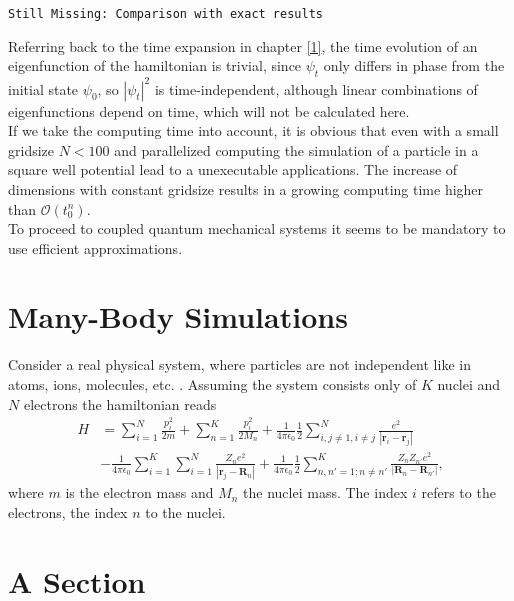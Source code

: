\documentclass[10pt,a4paper]{article} %
\begin{document}
\begin{lstlisting}
Still Missing: Comparison with exact results
\end{lstlisting}

Referring back to the time expansion in chapter \ref{1}, the time evolution of an eigenfunction of the hamiltonian is trivial, since $\psi_t$ only differs in phase from the initial state $\psi_0$, so ${|\psi_t|}^2$ is time-independent, although linear combinations of eigenfunctions depend on time, which will not be calculated here.\\

If we take the computing time into account, it is obvious that even with a small gridsize $N<100$ and parallelized computing the simulation of a particle in a square well potential lead to a unexecutable applications. The increase of dimensions with constant gridsize results in a growing computing time higher than $\mathcal O (t_0^n)$. \\

To proceed to coupled quantum mechanical systems it seems to be mandatory to use efficient approximations.




    \section{Many-Body Simulations}
    
    Consider a real physical system, where particles are not independent like in atoms, ions, molecules, etc. . Assuming the system consists only of $K$ nuclei and $N$ electrons the hamiltonian reads
    \begin{align*}
    H &= \sum_{i=1}^N \frac{p_i^2}{2m} + \sum_{n=1}^K \frac{p_i^2}{2M_n} + \frac{1}{4\pi \epsilon_0}\frac{1}{2}\sum_{i,j\neq 1, i \neq j}^N \frac{e^2}{|\mathbf{r}_i - \mathbf{r}_j|} \\ &-  \frac{1}{4\pi \epsilon_0}\sum_{i=1}^K \sum_{i=1}^N \frac{Z_n e^2}{|\mathbf{r}_j-\mathbf{R}_n|} +  \frac{1}{4\pi \epsilon_0}\frac{1}{2} \sum_{n,n'=1;n\neq n'}^K \frac{Z_n Z_{n'} e^2}{|\mathbf{R}_n - \mathbf{R}_{n'}|} \text{,}
    \end{align*} where $m$ is the electron mass and $M_n$ the nuclei mass. The index $i$ refers to the electrons, the index $n$ to the nuclei.
    
    \section{A Section}
    
    \nocite{*}
    
    
\end{document}
